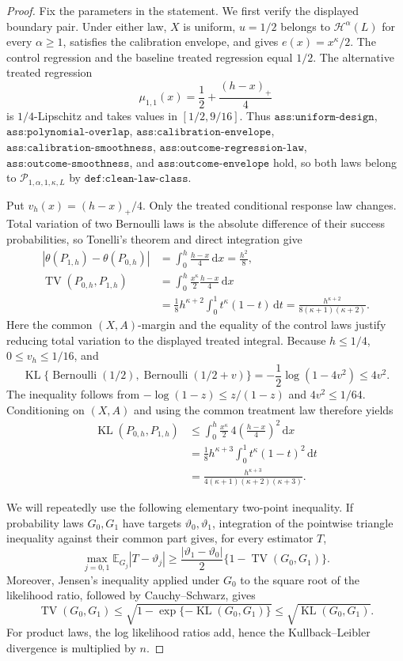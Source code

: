 \documentclass{article}
\begin{document}
\begin{proof}
Fix the parameters in the statement. We first verify the displayed boundary pair. Under either law, \(X\) is uniform, \(u=1/2\) belongs to \(\mathcal H^\alpha(L)\) for every \(\alpha\geq1\), satisfies the calibration envelope, and gives \(e(x)=x^\kappa/2\). The control regression and the baseline treated regression equal \(1/2\). The alternative treated regression
\[
\mu_{1,1}(x)=\frac12+\frac{(h-x)_+}{4}
\]
is \(1/4\)-Lipschitz and takes values in \([1/2,9/16]\). Thus \(\texttt{ass:uniform-design}\), \(\texttt{ass:polynomial-overlap}\), \(\texttt{ass:calibration-envelope}\), \(\texttt{ass:calibration-smoothness}\), \(\texttt{ass:outcome-regression-law}\), \(\texttt{ass:outcome-smoothness}\), and \(\texttt{ass:outcome-envelope}\) hold, so both laws belong to \(\mathcal P_{1,\alpha,1,\kappa,L}\) by \(\texttt{def:clean-law-class}\).

Put \(v_h(x)=(h-x)_+/4\). Only the treated conditional response law changes. Total variation of two Bernoulli laws is the absolute difference of their success probabilities, so Tonelli's theorem and direct integration give
\[
\begin{aligned}
|\theta(P_{1,h})-\theta(P_{0,h})|
&=\int_0^h\frac{h-x}{4}\,\mathrm dx=\frac{h^2}{8},\\
\operatorname{TV}(P_{0,h},P_{1,h})
&=\int_0^h\frac{x^\kappa}{2}\frac{h-x}{4}\,\mathrm dx\\
&=\frac18h^{\kappa+2}\int_0^1t^\kappa(1-t)\,\mathrm dt
=\frac{h^{\kappa+2}}{8(\kappa+1)(\kappa+2)}.
\end{aligned}
\]
Here the common \((X,A)\)-margin and the equality of the control laws justify reducing total variation to the displayed treated integral. Because \(h\leq1/4\), \(0\leq v_h\leq1/16\), and
\[
\operatorname{KL}\{\operatorname{Bernoulli}(1/2),
\operatorname{Bernoulli}(1/2+v)\}
=-\frac12\log(1-4v^2)\leq4v^2.
\]
The inequality follows from \(-\log(1-z)\leq z/(1-z)\) and \(4v^2\leq1/64\). Conditioning on \((X,A)\) and using the common treatment law therefore yields
\[
\begin{aligned}
\operatorname{KL}(P_{0,h},P_{1,h})
&\leq\int_0^h\frac{x^\kappa}{2}\,4
\left(\frac{h-x}{4}\right)^2\,\mathrm dx\\
&=\frac18h^{\kappa+3}\int_0^1t^\kappa(1-t)^2\,\mathrm dt\\
&=\frac{h^{\kappa+3}}
{4(\kappa+1)(\kappa+2)(\kappa+3)}.
\end{aligned}
\]

We will repeatedly use the following elementary two-point inequality. If probability laws \(G_0,G_1\) have targets \(\vartheta_0,\vartheta_1\), integration of the pointwise triangle inequality against their common part gives, for every estimator \(T\),
\[
\max_{j=0,1}\mathbb E_{G_j}|T-\vartheta_j|
\geq\frac{|\vartheta_1-\vartheta_0|}{2}
\{1-\operatorname{TV}(G_0,G_1)\}.
\tag{1}
\]
Moreover, Jensen's inequality applied under \(G_0\) to the square root of the likelihood ratio, followed by Cauchy--Schwarz, gives
\[
\operatorname{TV}(G_0,G_1)
\leq\sqrt{1-\exp\{-\operatorname{KL}(G_0,G_1)\}}
\leq\sqrt{\operatorname{KL}(G_0,G_1)}.
\tag{2}
\]
For product laws, the log likelihood ratios add, hence the Kullback--Leibler divergence is multiplied by \(n\).


\end{proof}
\end{document}
